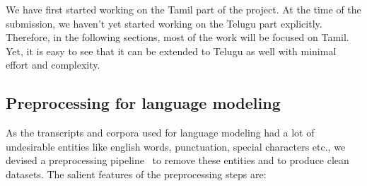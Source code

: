 \documentclass[11pt]{article} \usepackage{spconf,amsmath,graphicx}
\begin{document}
We have first started working on the Tamil part of the project. At the time of the submission, we haven't yet started working on the Telugu part explicitly.
Therefore, in the following sections, most of the work will be focused on Tamil. Yet, it is easy to see that it can be extended to Telugu as well with minimal effort
and complexity.

\subsection{Preprocessing for language modeling}
As the transcripts and corpora used for language modeling had a lot of undesirable entities like english words, punctuation, special characters etc.,
we devised a preprocessing pipeline~\cite{cleancorpus} to remove these entities and to produce clean datasets. The salient features of the preprocessing steps are:
\end{document}
